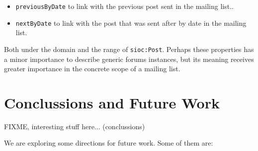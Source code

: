 \documentclass{llncs}
\begin{document}
\begin{itemize}
  \item \texttt{previousByDate} to link with the previous post sent in the 
	mailing list..
  \item \texttt{nextByDate} to link with the post that was sent after by date 
	in the mailing list.
\end{itemize}

Both under the domain and the range of \texttt{sioc:Post}. Perhaps these 
properties has a minor importance to describe generic forums instances, 
but its meaning receives greater importance in the concrete scope of a 
mailing list.

\section{Conclussions and Future Work}

FIXME, interesting stuff here... (conclussions)

We are exploring some directions for future work. Some of them are:
\end{document}
